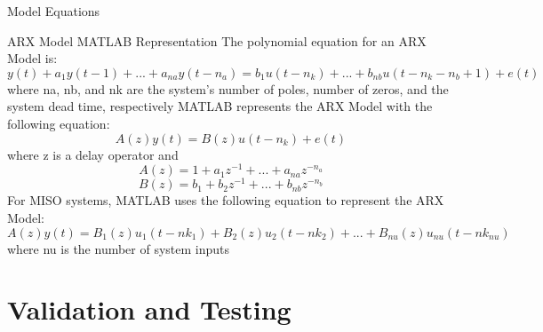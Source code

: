\documentclass{beamer}
\begin{document}
\begin{frame}{Model Equations}
	\tiny	
	\begin{block}{ARX Model MATLAB Representation}
		The polynomial equation for an ARX Model is:
		\begin{equation}
			y(t) + a_1y(t - 1) +...+a_{na}y(t - n_{a}) = b_{1}u(t-n_{k})+...+b_{nb}u(t - n_{k}-n_{b}+1) + e(t)
		\end{equation}
		where na, nb, and nk are the system’s number of poles, number of zeros, and the system dead time, respectively
		MATLAB represents the ARX Model with the following equation:
		\begin{equation}
			A(z)y(t) = B(z)u(t - n_k) + e(t)
		\end{equation}
		where z is a delay operator and 
		\begin{equation}
			A(z) = 1 + a_1z^{-1} + ... + a_{na}z^{-n_a}
		\end{equation}
		\begin{equation}
			B(z) = b_1 + b_2z^{-1} + ... + b_{nb}z^{-n_b}
		\end{equation}
		For MISO systems, MATLAB uses the following equation to represent the ARX Model:
		\begin{equation}
			A(z)y(t) = B_1(z)u_1(t - nk_{1}) + B_2(z)u_2(t - nk_{2}) + ... + B_{nu}(z)u_{nu}(t - nk_{nu})
		\end{equation}
		where nu is the number of system inputs
	\end{block}
\end{frame}

\section{Validation and Testing}
\end{document}
